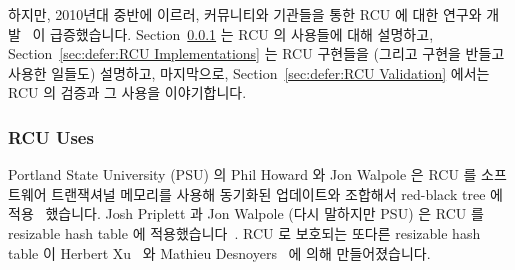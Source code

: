 하지만, 2010년대 중반에 이르러, 커뮤니티와 기관들을 통한 RCU 에 대한 연구와
개발~\cite{FransKaashoek2015ParallelOSHistory} 이 급증했습니다.
Section~\ref{sec:defer:RCU Uses} 는 RCU 의 사용들에 대해 설명하고,
Section~\ref{sec:defer:RCU Implementations} 는 RCU 구현들을 (그리고 구현을
반들고 사용한 일들도) 설명하고, 마지막으로,
Section~\ref{sec:defer:RCU Validation} 에서는 RCU 의 검증과 그 사용을
이야기합니다.
\iffalse

However, in the mid 2010s, there was a welcome upsurge in RCU research
and development across a number of communities and
institutions~\cite{FransKaashoek2015ParallelOSHistory}.
Section~\ref{sec:defer:RCU Uses} describes uses of RCU,
Section~\ref{sec:defer:RCU Implementations} describes RCU implementations
(as well as work that both creates and uses an implementation),
and finally,
Section~\ref{sec:defer:RCU Validation} describes verification and validation
of RCU and its uses.
\fi

\subsubsection{RCU Uses}
\label{sec:defer:RCU Uses}

Portland State University (PSU) 의 Phil Howard 와 Jon Walpole 은 RCU 를
소프트웨어 트랜잭셔널 메모리를 사용해 동기화된 업데이트와 조합해서 red-black
tree 에 적용~\cite{PhilHowardPhD,PhilHoward2011RCUTMRBTree} 했습니다.
Josh Priplett 과 Jon Walpole (다시 말하지만 PSU) 은 RCU 를 resizable hash table
에
적용했습니다~\cite{JoshTriplettPhD,Triplett:2011:RPHash,JonCorbet2014RCUhash1,JonCorbet2014RCUhash2}.
RCU 로 보호되는 또다른 resizable hash table 이 Herbert
Xu~\cite{HerbertXu2010RCUResizeHash} 와 Mathieu
Desnoyers~\cite{PaulMcKenney2013LWNURCUhash} 에 의해 만들어졌습니다.
\iffalse

Phil Howard and Jon Walpole of Portland State University (PSU) have
applied RCU to red-black
trees~\cite{PhilHowardPhD,PhilHoward2011RCUTMRBTree} combined with updates
synchronized using software transactional memory.
Josh Triplett and Jon Walpole (again of PSU) applied RCU to resizable
hash tables~\cite{JoshTriplettPhD,Triplett:2011:RPHash,JonCorbet2014RCUhash1,JonCorbet2014RCUhash2}.
Other RCU-protected resizable hash tables have been created by
Herbert Xu~\cite{HerbertXu2010RCUResizeHash} and by
Mathieu Desnoyers~\cite{PaulMcKenney2013LWNURCUhash}.
\fi

